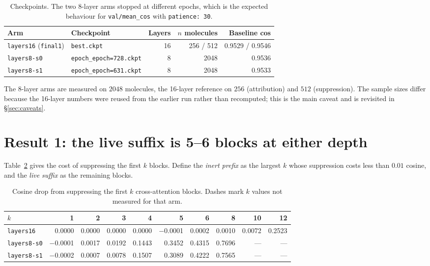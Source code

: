 \documentclass[11pt]{article}
\newcommand{\code}[1]{\texttt{\small #1}}
\begin{document}
\begin{table}[htbp]
\centering
\caption{Checkpoints. The two 8-layer arms stopped at different epochs, which is
the expected behaviour for \code{val/mean\_cos} with \code{patience: 30}.}
\label{tab:ckpts}
\small
\begin{tabular}{llrrr}
\toprule
Arm & Checkpoint & Layers & $n$ molecules & Baseline cos \\
\midrule
\code{layers16} (\code{final1}) & \code{best.ckpt}            & 16 & 256 / 512 & 0.9529 / 0.9546 \\
\code{layers8-s0}               & \code{epoch\_epoch=728.ckpt} & 8  & 2048      & 0.9536 \\
\code{layers8-s1}               & \code{epoch\_epoch=631.ckpt} & 8  & 2048      & 0.9533 \\
\bottomrule
\end{tabular}
\end{table}

The 8-layer arms are measured on $2048$ molecules, the 16-layer reference on
$256$ (attribution) and $512$ (suppression). The sample sizes differ because the
16-layer numbers were reused from the earlier run rather than recomputed; this
is the main caveat and is revisited in \S\ref{sec:caveats}.

\section{Result 1: the live suffix is 5--6 blocks at either depth}

Table~\ref{tab:first} gives the cost of suppressing the first $k$ blocks. Define
the \emph{inert prefix} as the largest $k$ whose suppression costs less than
$0.01$ cosine, and the \emph{live suffix} as the remaining blocks.

\begin{table}[htbp]
\centering
\caption{Cosine drop from suppressing the first $k$ cross-attention blocks.
Dashes mark $k$ values not measured for that arm.}
\label{tab:first}
\small
\begin{tabular}{lrrrrrrrrr}
\toprule
$k$ & 1 & 2 & 3 & 4 & 5 & 6 & 8 & 10 & 12 \\
\midrule
\code{layers16}   & 0.0000 & 0.0000 & 0.0000 & 0.0000 & $-$0.0001 & 0.0002 & 0.0010 & 0.0072 & 0.2523 \\
\code{layers8-s0} & $-$0.0001 & 0.0017 & 0.0192 & 0.1443 & 0.3452 & 0.4315 & 0.7696 & --- & --- \\
\code{layers8-s1} & $-$0.0002 & 0.0007 & 0.0078 & 0.1507 & 0.3089 & 0.4222 & 0.7565 & --- & --- \\
\bottomrule
\end{tabular}
\end{table}
\end{document}
